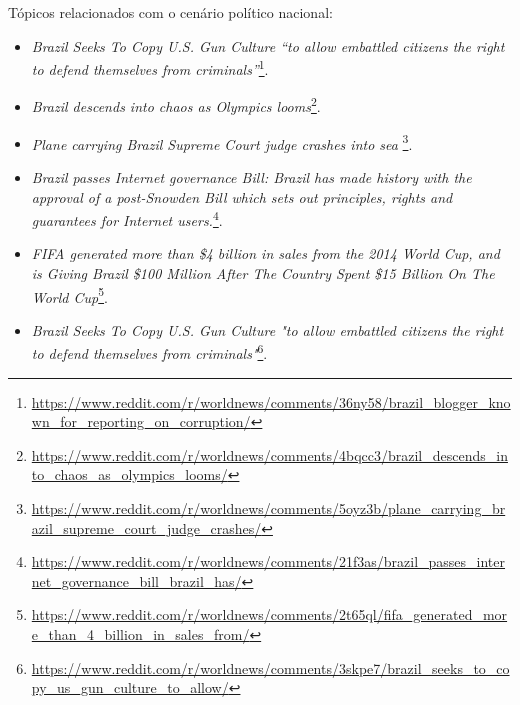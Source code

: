 Tópicos relacionados com o cenário político nacional:
\begin{itemize}
  \item
  \textit{Brazil Seeks To Copy U.S. Gun Culture ``to allow embattled
  citizens the right to defend themselves from
  criminals''}\footnote{
  \url{https://www.reddit.com/r/worldnews/comments/36ny58/brazil_blogger_known_for_reporting_on_corruption/}}.
  \item
  \textit{Brazil descends into chaos as Olympics looms}\footnote{
  \url{https://www.reddit.com/r/worldnews/comments/4bqcc3/brazil_descends_into_chaos_as_olympics_looms/}}.
  \item
  \textit{Plane carrying Brazil Supreme Court judge crashes into sea}
  \footnote{\url{https://www.reddit.com/r/worldnews/comments/5oyz3b/plane_carrying_brazil_supreme_court_judge_crashes/}}.
  \item
  \textit{Brazil passes Internet governance Bill: Brazil has made history with
  the approval of a post-Snowden Bill which sets out principles, rights and guarantees for Internet users.}\footnote{\url{https://www.reddit.com/r/worldnews/comments/21f3as/brazil_passes_internet_governance_bill_brazil_has/}}.
  \item
  \textit{FIFA generated more than \$4 billion in sales from the 2014 World Cup,
  and is Giving Brazil \$100 Million After The Country Spent \$15 Billion On The
  World Cup}\footnote{\url{https://www.reddit.com/r/worldnews/comments/2t65ql/fifa_generated_more_than_4_billion_in_sales_from/}}.
  \item
  \textit{Brazil Seeks To Copy U.S. Gun Culture "to allow embattled citizens the
  right to defend themselves from
  criminals"}\footnote{\url{https://www.reddit.com/r/worldnews/comments/3skpe7/brazil_seeks_to_copy_us_gun_culture_to_allow/}}.
\end{itemize}

